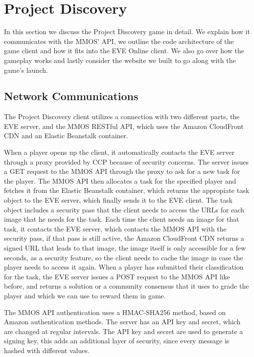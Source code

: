 \section{Project Discovery}\label{sec:projectdiscovery}

	In this section we discuss the Project Discovery game in detail. We explain how it communicates with the MMOS' API, we outline the code architecture of the game client and how it fits into the EVE Online client. We also go over how the gameplay works and lastly consider the website we built to go along with the game's launch.

\subsection{Network Communications}
	The Project Discovery client utilizes a connection with two different parts, the EVE server, and the MMOS RESTful API, which uses the Amazon CloudFront CDN and an Elastic Beanstalk container.

	When a player opens up the client, it automatically contacts the EVE server through a proxy provided by CCP because of security concerns. The server issues a GET request to the MMOS API through the proxy to ask for a new task for the player. The MMOS API then allocates a task for the specified player and fetches it from the Elastic Beanstalk container, which returns the appropiate task object to the EVE server, which finally sends it to the EVE client. The task object includes a security pass that the client needs to access the URLs for each image that he needs for the task. Each time the client needs an image for that task, it contacts the EVE server, which contacts the MMOS API with the security pass, if that pass is still active, the Amazon CloudFront CDN returns a signed URL that leads to that image, the image itself is only accessible for a few seconds, as a security feature, so the client needs to cache the image in case the player needs to access it again. When a player has submitted their classification for the task, the EVE server issues a POST request to the MMOS API like before, and returns a solution or a community consensus that it uses to grade the player and which we can use to reward them in game.

	The MMOS API authentication uses a HMAC-SHA256 method, based on Amazon authentication methods. The server has an API key and secret, which are changed at regular intervals. The API key and secret are used to generate a signing key, this adds an additional layer of security, since every message is hashed with different values.

